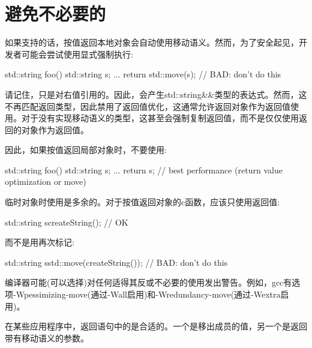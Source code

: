\section{避免不必要的}
如果支持的话，按值返回本地对象会自动使用移动语义。然而，为了安全起见，开发者可能会尝试使用显式强制执行:

\begin{cppcode}
std::string foo()
{
	std::string s;
	...
	return std::move(s); // BAD: don’t do this
}
\end{cppcode}

请记住，只是对右值引用的。因此，会产生std::string\&\&类型的表达式。然而，这不再匹配返回类型，因此禁用了返回值优化，这通常允许返回对象作为返回值使用。对于没有实现移动语义的类型，这甚至会强制复制返回值，而不是仅仅使用返回的对象作为返回值。

因此，如果按值返回局部对象时，不要使用:

\begin{cppcode}
std::string foo()
{
	std::string s;
	...
	return s; // best performance (return value optimization or move)
}
\end{cppcode}

临时对象时使用是多余的。对于按值返回对象的c函数，应该只使用返回值:

\begin{cppcode}
std::string s{createString()}; // OK
\end{cppcode}

而不是用再次标记:

\begin{cppcode}
std::string s{std::move(createString())}; // BAD: don’t do this
\end{cppcode}

编译器可能(可以选择)对任何适得其反或不必要的使用发出警告。例如，gcc有选项-Wpessimizing-move(通过-Wall启用)和-Wredundancy-move(通过-Wextra启用)。

在某些应用程序中，返回语句中的是合适的。一个是移出成员的值，另一个是返回带有移动语义的参数。
















